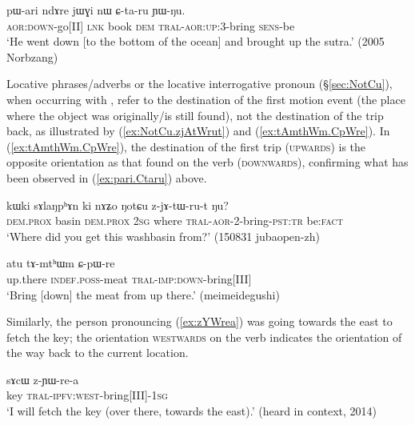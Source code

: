 \begin{exe}
\ex \label{ex:pari.Ctaru}
\gll  pɯ-ari ndɤre jɯɣi nɯ ɕ-ta-ru ɲɯ-ŋu. \\
\textsc{aor}:\textsc{down}-go[II] \textsc{lnk} book \textsc{dem} \textsc{tral}-\textsc{aor}:\textsc{up}:3\flobv{}-bring \textsc{sens}-be \\
\glt `He went down [to the bottom of the ocean] and brought up the sutra.' (2005 Norbzang)
\end{exe}

Locative phrases/adverbs or the locative interrogative pronoun  (§\ref{sec:NotCu}), when occurring with , refer to the destination of the first motion event (the place where the object was originally/is still found), not the destination of the trip back, as illustrated by (\ref{ex:NotCu.zjAtWrut}) and (\ref{ex:tAmthWm.CpWre}). In (\ref{ex:tAmthWm.CpWre}), the destination of the first trip (\textsc{upwards}) is the opposite orientation as that found on the verb (\textsc{downwards}), confirming what has been observed in (\ref{ex:pari.Ctaru}) above.

\begin{exe}
\ex \label{ex:NotCu.zjAtWrut}
\gll kɯki sɤlaŋpʰɤn ki nɤʑo ŋotɕu z-jɤ-tɯ-ru-t ŋu? \\
\textsc{dem}.\textsc{prox} basin \textsc{dem}.\textsc{prox} \textsc{2sg} where \textsc{tral}-\textsc{aor}-2-bring-\textsc{pst}:\textsc{tr} be:\textsc{fact} \\
\glt `Where did you get this washbasin from?' (150831 jubaopen-zh)
\end{exe}

\begin{exe}
\ex \label{ex:tAmthWm.CpWre}
\gll atu tɤ-mtʰɯm ɕ-pɯ-re \\
up.there \textsc{indef}.\textsc{poss}-meat \textsc{tral}-\textsc{imp}:\textsc{down}-bring[III] \\
\glt `Bring [down] the meat from up there.' (meimeidegushi)
\end{exe}

Similarly, the person pronouncing (\ref{ex:zYWrea}) was going towards the east to fetch the key; the orientation \textsc{westwards} on the verb indicates the orientation of the way back to the current location.

\begin{exe}
\ex \label{ex:zYWrea}
\gll sɤcɯ z-ɲɯ-re-a \\
key \textsc{tral}-\textsc{ipfv}:\textsc{west}-bring[III]-\textsc{1sg} \\
\glt `I will fetch the key (over there, towards the east).' (heard in context, 2014)
\end{exe}

